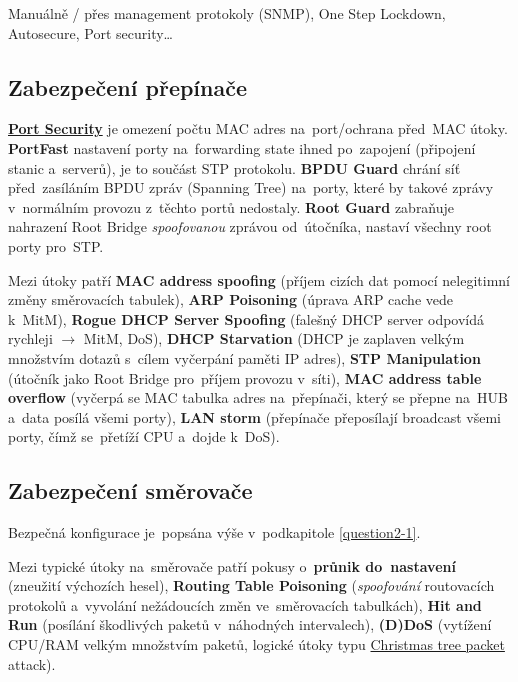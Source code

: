Manuálně / přes management protokoly (SNMP), One Step Lockdown, Autosecure, Port security\dots

\subsection{Zabezpečení přepínače}

\textbf{\href{https://en.wikipedia.org/wiki/MAC_filtering}{Port Security}} je omezení počtu MAC adres na~port/ochrana před~MAC útoky. \textbf{PortFast} nastavení porty na~forwarding state ihned po~zapojení (připojení stanic a~serverů), je to součást STP protokolu. \textbf{BPDU Guard} chrání síť před~zasíláním BPDU zpráv (Spanning Tree) na~porty, které by takové zprávy v~normálním provozu z~těchto portů nedostaly. \textbf{Root Guard} zabraňuje nahrazení Root Bridge \emph{spoofovanou} zprávou od~útočníka, nastaví všechny root porty pro~STP.

Mezi útoky patří \textbf{MAC address spoofing} (příjem cizích dat pomocí nelegitimní změny směrovacích tabulek), \textbf{ARP Poisoning} (úprava ARP cache vede k~MitM), \textbf{Rogue DHCP Server Spoofing} (falešný DHCP server odpovídá rychleji $\rightarrow$ MitM, DoS), \textbf{DHCP Starvation} (DHCP je zaplaven velkým množstvím dotazů s~cílem vyčerpání paměti IP adres), \textbf{STP Manipulation} (útočník jako Root Bridge pro~příjem provozu v~síti), \textbf{MAC address table overflow} (vyčerpá se MAC tabulka adres na~přepínači, který se přepne na~HUB a~data posílá všemi porty), \textbf{LAN storm} (přepínače přeposílají broadcast všemi porty, čímž se~přetíží CPU a~dojde k~DoS).

\subsection{Zabezpečení směrovače}

Bezpečná konfigurace je~popsána výše v~podkapitole \ref{question2-1}.

Mezi typické útoky na~směrovače patří pokusy o~\textbf{průnik do~nastavení} (zneužití výchozích hesel), \textbf{Routing Table Poisoning} (\emph{spoofování} routovacích protokolů a~vyvolání nežádoucích změn ve~směrovacích tabulkách), \textbf{Hit and Run} (posílání škodlivých paketů v~náhodných intervalech), \textbf{(D)DoS} (vytížení CPU/RAM velkým množstvím paketů, logické útoky typu \href{https://en.wikipedia.org/wiki/Christmas_tree_packet}{Christmas tree packet} attack).

